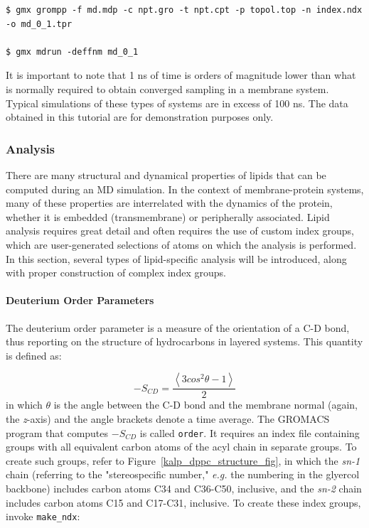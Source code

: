 \documentclass[9pt,tutorial,pubversion]{livecoms}
\begin{document}
\begin{lstlisting}
$ gmx grompp -f md.mdp -c npt.gro -t npt.cpt -p topol.top -n index.ndx -o md_0_1.tpr

$ gmx mdrun -deffnm md_0_1
\end{lstlisting}

It is important to note that 1 ns of time is orders of magnitude lower than what is normally required to obtain converged sampling in a membrane system. Typical simulations of these types of systems are in excess of 100 ns. The data obtained in this tutorial are for demonstration purposes only.

\subsubsection{Analysis} \label{kalp_ana}

There are many structural and dynamical properties of lipids that can be computed during an MD simulation. In the context of membrane-protein systems, many of these properties are interrelated with the dynamics of the protein, whether it is embedded (transmembrane) or peripherally associated. Lipid analysis requires great detail and often requires the use of custom index groups, which are user-generated selections of atoms on which the analysis is performed. In this section, several types of lipid-specific analysis will be introduced, along with proper construction of complex index groups.

\paragraph{Deuterium Order Parameters} \label{kalp_ana_scd}

The deuterium order parameter is a measure of the orientation of a C-D bond, thus reporting on the structure of hydrocarbons in layered systems. This quantity is defined as:

\begin{equation} \label{eq_scd}
-S_{CD} = \frac{\left\langle 3 cos^2 \theta - 1\right\rangle}{2}
\end{equation}
%
in which $\theta$ is the angle between the C-D bond and the membrane normal (again, the {\em z}-axis) and the angle brackets denote a time average. The GROMACS program that computes $-S_{CD}$ is called \texttt{order}. It requires an index file containing groups with all equivalent carbon atoms of the acyl chain in separate groups. To create such groups, refer to Figure~\ref{kalp_dppc_structure_fig}, in which the {\em sn-1} chain (referring to the "stereospecific number," {\em e.g.} the numbering in the glyercol backbone) includes carbon atoms C34 and C36-C50, inclusive, and the {\em sn-2} chain includes carbon atoms C15 and C17-C31, inclusive. To create these index groups, invoke \texttt{make\_ndx}:
\end{document}
